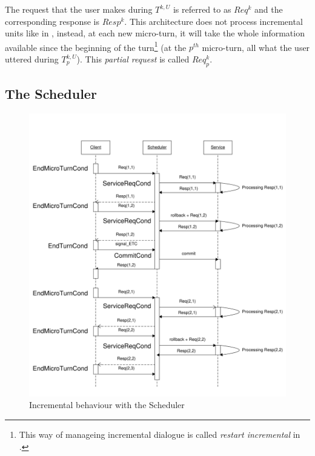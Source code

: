         The request that the user makes during $T^{k,U}$ is referred to as $Req^k$ and the corresponding response is $Resp^k$. This architecture does not process incremental units like in \cite{Schlangen2011}, instead, at each new micro-turn, it will take the whole information available since the beginning of the turn\footnote{This way of manageing incremental dialogue is called \textit{restart incremental} in \cite{Schlangen2011}.} (at the $p^{th}$ micro-turn, all what the user uttered during $T^{k,U}_p$). This \textit{partial request} is called $Req^k_p$.
        
    \subsection{The Scheduler}
    
    	\begin{figure}[ht]
          \centering
          \includegraphics[scale=0.8]{figures/SchedulerDiagEng.pdf}
          \caption{Incremental behaviour with the Scheduler}
          \label{fig:schedchrono}
        \end{figure}
    
